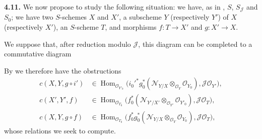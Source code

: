 

\medskip
\noindent{}\textbf{4.11.}
We now propose to study the following situation: we have, as in
, \(S\), \(S_{\mathscr J}\) and \(S_0\); we have two
\(S\)-schemes \(X\) and \(X'\), a subscheme \(Y\) (respectively \(Y'\)) of
\(X\) (respectively \(X'\)), an \(S\)-scheme \(T\), and morphisms
\(f:T\to X'\) and \(g:X'\to X\).

\begin{center}
\end{center}

We suppose that, after reduction modulo \(\mathscr J\), this diagram can
be completed to a commutative diagram

\begin{center}
\end{center}

By  we therefore have the obstructions
\begin{align*}
 c(X,Y,g\circ i')&\in
 \operatorname{Hom}_{\mathscr O_{Y'_0}}
 \bigl(i_0'^*g_0^*(\mathscr N_{Y/X}
   \otimes_{\mathscr O_Y}\mathscr O_{Y_0}),
   \mathscr J\mathscr O_{Y'}\bigr),\\
 c(X',Y',f)&\in
 \operatorname{Hom}_{\mathscr O_{T_0}}
 \bigl(f_0^*(\mathscr N_{Y'/X'}
   \otimes_{\mathscr O_{Y'}}\mathscr O_{Y'_0}),
   \mathscr J\mathscr O_T\bigr),\\
 c(X,Y,g\circ f)&\in
 \operatorname{Hom}_{\mathscr O_{T_0}}
 \bigl(f_0^*g_0^*(\mathscr N_{Y/X}
   \otimes_{\mathscr O_Y}\mathscr O_{Y_0}),
   \mathscr J\mathscr O_T\bigr),
\end{align*}
whose relations we seek to compute.

